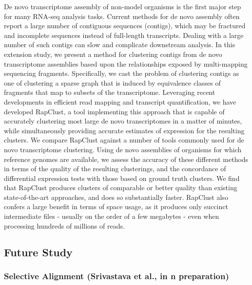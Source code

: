 De novo transcriptome assembly of non-model organisms is the first major step for many 
RNA-seq analysis tasks. Current methods for de novo assembly often report a large number 
of contiguous sequences (contigs), which may be fractured and incomplete sequences 
instead of full-length transcripts. Dealing with a large number of such contigs can 
slow and complicate downstream analysis. In this extension study, we present a method 
for clustering contigs from de novo transcriptome assemblies based upon the relationships 
exposed by multi-mapping sequencing fragments. Specifically, we cast the problem of 
clustering contigs as one of clustering a sparse graph that is induced by equivalence 
classes of fragments that map to subsets of the transcriptome. Leveraging recent developments 
in efficient read mapping and transcript quantification, we have developed RapClust, a tool 
implementing this approach that is capable of accurately clustering most large de novo 
transcriptomes in a matter of minutes, while simultaneously providing accurate estimates of 
expression for the resulting clusters. We compare RapClust against a number of tools commonly 
used for de novo transcriptome clustering. Using de novo assemblies of organisms for which 
reference genomes are available, we assess the accuracy of these different methods in terms of 
the quality of the resulting clusterings, and the concordance of differential expression tests 
with those based on ground truth clusters. We find that RapClust produces clusters of comparable 
or better quality than existing state-of-the-art approaches, and does so substantially faster. 
RapClust also confers a large benefit in terms of space usage, as it produces only succinct 
intermediate files - usually on the order of a few megabytes - even when processing hundreds 
of millions of reads.

\subsection{Future Study}
\subsubsection{Selective Alignment (Srivastava et al., in n preparation)}

